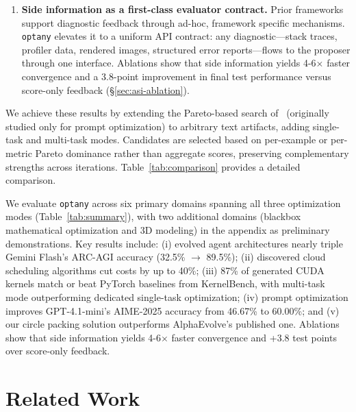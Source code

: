 \documentclass[sigconf,anonymous,review]{acmart}
\newcommand{\oa}{\texttt{optany}}
\begin{document}
\begin{enumerate}[leftmargin=*,itemsep=2pt]
\item \textbf{Side information as a first-class evaluator contract.} Prior frameworks support diagnostic feedback through ad-hoc, framework specific mechanisms. \oa{} elevates it to a uniform API contract: any diagnostic---stack traces, profiler data, rendered images, structured error reports---flows to the proposer through one interface. Ablations show that side information yields 4-6$\times$ faster convergence and a 3.8-point improvement in final test performance versus score-only feedback (\S\ref{sec:asi-ablation}).
\end{enumerate}

We achieve these results by extending the Pareto-based search of~\citet{agrawal2026gepa} (originally studied only for prompt optimization) to arbitrary text artifacts, adding single-task and multi-task modes. Candidates are selected based on per-example or per-metric Pareto dominance rather than aggregate scores, preserving complementary strengths across iterations. Table~\ref{tab:comparison} provides a detailed comparison.

We evaluate \oa{} across six primary domains spanning all three optimization modes (Table~\ref{tab:summary}), with two additional domains (blackbox mathematical optimization and 3D modeling) in the appendix as preliminary demonstrations. Key results include: (i) evolved agent architectures nearly triple Gemini Flash's ARC-AGI accuracy (32.5\% $\to$ 89.5\%); (ii) discovered cloud scheduling algorithms cut costs by up to 40\%; (iii) 87\% of generated CUDA kernels match or beat PyTorch baselines from KernelBench, with multi-task mode outperforming dedicated single-task optimization; (iv) prompt optimization improves GPT-4.1-mini's AIME-2025 accuracy from 46.67\% to 60.00\%; and (v) our circle packing solution outperforms AlphaEvolve's published one. Ablations show that side information yields 4-6$\times$ faster convergence and +3.8 test points over score-only feedback.

\section{Related Work}\label{sec:related}
\end{document}
